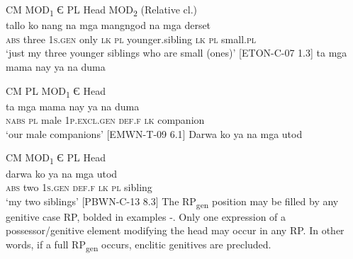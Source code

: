 CM  MOD\textsubscript{1}  {Є}  \hspace{50pt}     PL \hspace{4pt}  Head \hspace{58pt}   MOD\textsubscript{2} (Relative cl.) \\
\gll \emptyset{} tallo  ko  nang  na  mga  mangngod  na  mga  derset \\
\textsc{abs} three  1\textsc{s.gen}  only  \textsc{lk}  \textsc{pl}  younger.sibling  \textsc{lk}  \textsc{pl}  small.\textsc{pl} \\
\glt ‘just my three younger siblings who are small (ones)’ [ETON-C-07 1.3]
\z
\ea
ta  mga  mama  nay  ya  na  duma \\\smallskip

CM \hspace{4pt} PL \hspace{6pt} MOD\textsubscript{1} {Є} \hspace{80pt}       Head \\
\gll ta  mga  mama  nay  ya  na  duma \\
\textsc{nabs} \textsc{pl}  male  1\textsc{p.excl.gen}  \textsc{def.f}  \textsc{lk}  companion \\
\glt ‘our male companions’ [EMWN-T-09 6.1]
\z
\ea
\label{bkm:Ref447702062}
Darwa  ko  ya  na  mga  utod \\\smallskip

CM  MOD\textsubscript{1}  {Є}  \hspace{58pt}    PL \hspace{3pt} Head \\
\gll \emptyset{} darwa  ko  ya  na  mga  utod \\
\textsc{abs} two  1\textsc{s.gen}  \textsc{def.f}  \textsc{lk}  \textsc{pl}  sibling \\
\glt ‘my two siblings’ [PBWN-C-13 8.3]
\z
The RP\textsubscript{gen} position may be filled by any genitive case RP, bolded in examples -. Only one expression of a possessor/genitive element modifying the head may occur in any RP. In other words, if a full RP\textsubscript{gen} occurs, enclitic genitives are precluded.


